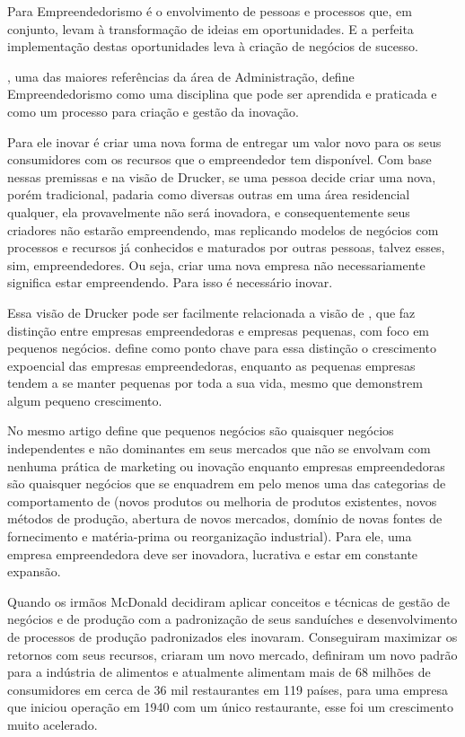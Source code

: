 Para \cite{Dornelas2005} Empreendedorismo é o envolvimento de pessoas e processos que, em conjunto, levam à transformação de ideias em oportunidades. E a perfeita implementação destas oportunidades leva à criação de negócios de sucesso.

\cite{Drucker2006}, uma das maiores referências da área de Administração, define Empreendedorismo como uma disciplina que pode ser aprendida e praticada e como um processo para criação e gestão da inovação. 

Para ele inovar é criar uma nova forma de entregar um valor novo para os seus consumidores com os recursos que o empreendedor tem disponível. Com base nessas premissas e na visão de Drucker, se uma pessoa decide criar uma nova, porém tradicional, padaria como diversas outras em uma área residencial qualquer, ela provavelmente não será inovadora, e consequentemente seus criadores não estarão empreendendo, mas replicando modelos de negócios com processos e recursos já conhecidos e maturados por outras pessoas, talvez esses, sim, empreendedores. Ou seja, criar uma nova empresa não necessariamente significa estar empreendendo. Para isso é necessário inovar. 

Essa visão de Drucker pode ser facilmente relacionada a visão de \cite{Thurik2004}, que faz distinção entre empresas empreendedoras e empresas pequenas, com foco em pequenos negócios. \cite{Carland1984} define como ponto chave para essa distinção o crescimento expoencial das empresas empreendedoras, enquanto as pequenas empresas tendem a se manter pequenas por toda a sua vida, mesmo que demonstrem algum pequeno crescimento. 

No mesmo artigo \cite{Carland1984} define que pequenos negócios são quaisquer negócios independentes e não dominantes em seus mercados que não se envolvam com nenhuma prática de marketing ou inovação enquanto empresas empreendedoras são quaisquer negócios que se enquadrem em pelo menos uma das categorias de comportamento de \cite{Schumpeter1934} (novos produtos ou melhoria de produtos existentes, novos métodos de produção, abertura de novos mercados, domínio de novas fontes de fornecimento e matéria-prima ou reorganização industrial). Para ele, uma empresa empreendedora deve ser inovadora, lucrativa e estar em constante expansão.

Quando os irmãos McDonald decidiram aplicar conceitos e técnicas de gestão de negócios e de produção com a padronização de seus sanduíches e desenvolvimento de processos de produção padronizados eles inovaram. Conseguiram maximizar os retornos com seus recursos, criaram um novo mercado, definiram um novo padrão para a indústria de alimentos e atualmente alimentam mais de 68 milhões de consumidores em cerca de 36 mil restaurantes em 119 países, para uma empresa que iniciou operação em 1940 com um único restaurante, esse foi um crescimento muito acelerado.

